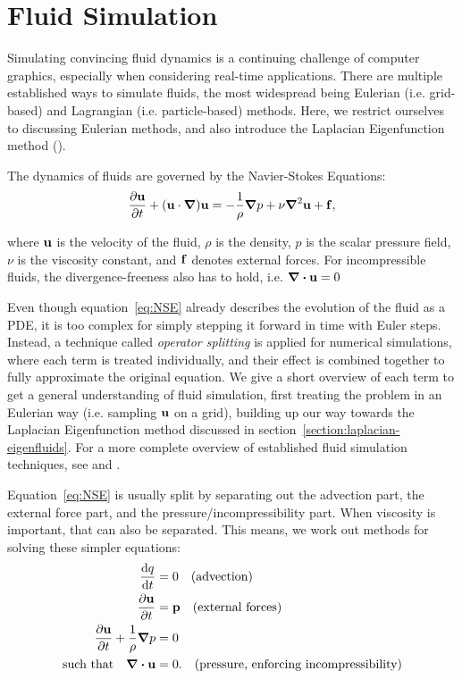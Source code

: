 \chapter{Fluid Simulation}\label{chapter:fluid-simulation}
Simulating convincing fluid dynamics is a continuing challenge of computer
graphics, especially when considering real-time applications. There are multiple
established ways to simulate fluids, the most widespread being Eulerian (i.e.
grid-based) and Lagrangian (i.e. particle-based) methods. Here, we restrict
ourselves to discussing Eulerian methods, and also introduce the Laplacian
Eigenfunction method (\cite{dewitt}).

The dynamics of fluids are governed by the Navier-Stokes Equations:
\begin{equation}\label{eq:NSE}
    \pdv{\vb{u}}{t} + (\vb{u}\cdot\grad)\vb{u}
    = -\frac{1}{\rho}\grad{p} + \nu\grad^2\vb{u} + \vb{f},
\end{equation}

where $\vb{u}$ is the velocity of the fluid, $\rho$ is the density, $p$ is the
scalar pressure field, $\nu$ is the viscosity constant, and $\vb{f}$ denotes
external forces. For incompressible fluids, the divergence-freeness also has to
hold, i.e. $\div{\vb{u}} = 0$

Even though equation~\eqref{eq:NSE} already describes the evolution of the fluid
as a \acf{PDE}, it is too complex for simply stepping it forward in time with
Euler steps. Instead, a technique called \textit{operator splitting} is applied
for numerical simulations, where each term is treated individually, and their
effect is combined together to fully approximate the original equation. We give
a short overview of each term to get a general understanding of fluid
simulation, first treating the problem in an Eulerian way (i.e.  sampling
$\vb{u}$ on a grid), building up our way towards the Laplacian Eigenfunction
method discussed in section~\ref{section:laplacian-eigenfluids}.  For a more
complete overview of established fluid simulation techniques, see
\cite{FluidNotes} and \cite{BridsonFluid}.

Equation~\eqref{eq:NSE} is usually split by separating out the advection part,
the external force part, and the pressure/incompressibility part. When viscosity
is important, that can also be separated. This means, we work out methods for
solving these simpler equations:
\begin{align*}
    \dv{q}{t} &= 0              \qq{(advection)}\\
    \pdv{\vb{u}}{t} &= \vb{p}   \qq{(external forces)}\\
    \pdv{\vb{u}}{t} + \frac{1}{\rho}\grad p &= 0 \\
    \qq{such that}\div{\vb{u}} &= 0.
                                \qq{(pressure, enforcing incompressibility)}
\end{align*}

